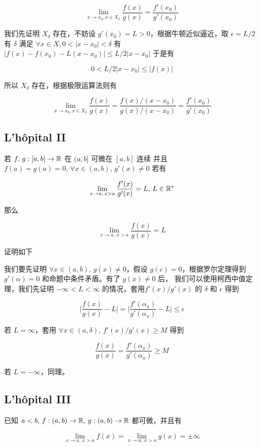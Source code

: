 \[
\lim_{x \to x_0, x \in X_{\delta}} \frac{f(x)}{g(x)} = \frac{f'(x_0)}{g'(x_0)}
\]

我们先证明 $X_{\delta}$ 存在，不妨设 $g'(x_0) = L > 0$，根据牛顿近似逼近，取 $\epsilon = L/2$ 有 $\delta$ 满足 $\forall x \in X, 0 < \lvert x -x_0\rvert < \delta$ 有
$ \lvert f(x) - f(x_0) - L(x-x_0)\rvert \le L/2 \lvert x -x_0 \rvert$
于是有 

\[
0 < L/2 \lvert x -x_0 \rvert\le \lvert f(x) \rvert
\]

所以 $X_{\delta}$ 存在，根据极限运算法则有

\[
\lim_{x \to x_0, x \in X_{\delta}} \frac{f(x)}{g(x)} = \frac{f(x)/(x-x_0)}{g(x)/(x-x_0)} = \frac{f'(x_0)}{g'(x_0)}
\]


\subsection{L'h\^{o}pital II}

若 $f,\,g : [a,b] \to \mathbb{R}$ 在 $(a,b]$  可微在 $[a,b]$ 连续 并且 $f(a) = g(a) = 0,\, \forall x \in (a,b),\, g'(x) \ne 0$
若有

\[
\lim_{x \to a,\, x>a}\frac{f'(x)}{g'(x)} =L ,\, L \in \mathbb{R}^*
\]

那么

\[
\lim_{x \to a,\, x>a}\frac{f(x)}{g(x)} =L
\]

证明如下

我们要先证明 $\forall x \in (a,b),\, g(x) \ne 0$，假设 $g(c) = 0$，根据罗尔定理得到 $g'(\alpha) = 0$ 和命题中条件矛盾。有了 $g(x) \ne 0$ 后，
我们可以使用柯西中值定理，我们先证明 $- \infty < L < \infty$ 的情况，套用$f'(x)/g'(x)$ 的 $\delta$ 和 $\epsilon$ 得到

\[
\lvert \frac{f(x)}{g(x)} - L \rvert = \lvert \frac{f'(\alpha_x)}{g'(\alpha_x)} -L \rvert \le \epsilon
\]

若 $L = \infty$，套用 $\forall x \in (a,\delta),\, f'(x)/g'(x) \ge M$ 得到

\[
\frac{f(x)}{g(x)} = \frac{f'(\alpha_x)}{g'(\alpha_x)} \ge M
\]

若 $L = -\infty$，同理。

\subsection{L'h\^{o}pital III}

已知 $a < b,\, f : (a,b) \to \mathbb{R},\, g : (a,b) \to \mathbb{R} $ 都可微，并且有 

\[
\lim_{x \to a,\, x > a}  f(x) = \lim_{x \to a,\, x > a}  g(x) = \pm \infty
\]


